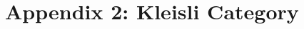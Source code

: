\documentclass{article}
\begin{document}
\hfil

\newpage

\section{Appendix 2: Kleisli Category}
\end{document}

